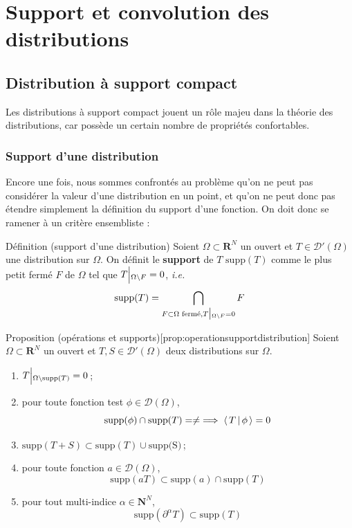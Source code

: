 \newpage

\section{Support et convolution des distributions}

    \subsection{Distribution à support compact}

        Les distributions à support compact jouent un rôle majeu dans la théorie des distributions, car possède un certain nombre de propriétés confortables.

        \subsubsection{Support d’une distribution}

        Encore une fois, nous sommes confrontés au problème qu’on ne peut pas considérer la valeur d’une distribution en un point, et qu’on ne peut donc pas étendre simplement la définition du support d’une fonction. On doit donc se ramener à un critère ensembliste :

        \begin{omed}{Définition (support d’une distribution)}
            Soient $\Omega \subset \mathbf{R}^N$ un ouvert et $T \in \mathcal{D}'(\Omega)$ une distribution sur $\Omega$. On définit le \textbf{support} de $T$ $\text{supp}(T)$ comme le plus petit fermé $F$ de $\Omega$ tel que $T \Big|\vphantom{\big|}_{\Omega \backslash F} = 0$, \textit{i.e.}
            \[ \text{supp}(T) = \bigcap_{F \subset \Omega \text{ fermé}, T \big|\vphantom{|}_{\Omega \backslash F} = 0} F \]
        \end{omed}

        \begin{omed}{Proposition (opérations et supports)}[prop:operationsupportdistribution]
            Soient $\Omega \subset \mathbf{R}^N$ un ouvert et $T, S \in \mathcal{D}'(\Omega)$ deux distributions sur $\Omega$. 
            \begin{enumerate}[label=($p_{\arabic*}$)]
                \item $T \Big|\vphantom{\big|}_{\Omega \backslash \text{supp}(T)} = 0$ ;
                \item pour toute fonction test $\phi \in \mathcal{D}(\Omega)$, 
                \[ \text{supp}(\phi) \cap \text{supp}(T) = \neq \implies \left< \, T \, \middle| \, \phi \, \right> = 0 \]   
                \item $\text{supp}(T + S) \subset \text{supp}(T) \cup \text{supp(S)}$ ;
                \item pour toute fonction $a \in \mathcal{D}(\Omega)$, 
                \[ \text{supp}(aT) \subset \text{supp}(a) \cap \text{supp}(T) \]   
                \item pour tout multi-indice $\alpha \in \mathbf{N}^N$, 
                \[ \text{supp}(\partial^{\alpha} T) \subset \text{supp}(T) \]   
            \end{enumerate}
        \end{omed}

